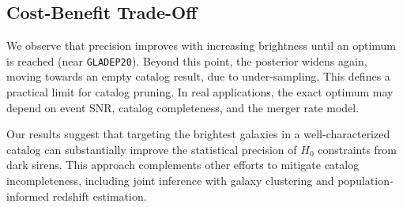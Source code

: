 \subsection{Cost-Benefit Trade-Off} 
We observe that precision improves with increasing brightness until an optimum is reached (near \texttt{GLADEP20}). Beyond this point, the posterior widens again, moving towards an empty catalog result, due to under-sampling. This defines a practical limit for catalog pruning. In real applications, the exact optimum may depend on event SNR, catalog completeness, and the merger rate model.

Our results suggest that targeting the brightest galaxies in a well-characterized catalog can substantially improve the statistical precision of $H_0$ constraints from dark sirens. This approach complements other efforts to mitigate catalog incompleteness, including joint inference with galaxy clustering and population-informed redshift estimation.